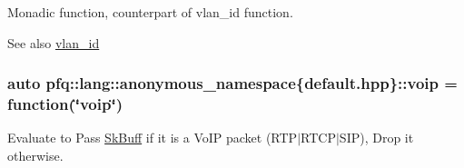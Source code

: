 Monadic function, counterpart of {\ttfamily vlan\+\_\+id} function. 

\begin{DoxySeeAlso}{See also}
\hyperlink{namespacepfq_1_1lang_1_1anonymous__namespace_02default_8hpp_03_ad2a631020f34bf10335ebb0e79f03920}{vlan\+\_\+id} 
\end{DoxySeeAlso}
\subsubsection[{\texorpdfstring{voip}{voip}}]{\setlength{\rightskip}{0pt plus 5cm}auto pfq\+::lang\+::anonymous\+\_\+namespace\{default.\+hpp\}\+::voip = {\bf function}(\char`\"{}voip\char`\"{})}\hypertarget{namespacepfq_1_1lang_1_1anonymous__namespace_02default_8hpp_03_a814df3093ef905eedf9a9add4c625147}{}\label{namespacepfq_1_1lang_1_1anonymous__namespace_02default_8hpp_03_a814df3093ef905eedf9a9add4c625147}


Evaluate to {\ttfamily Pass} \hyperlink{structpfq_1_1lang_1_1SkBuff}{Sk\+Buff} if it is a Vo\+IP packet (R\+T\+P$\vert$\+R\+T\+C\+P$\vert$\+S\+IP), {\ttfamily Drop} it otherwise. 


